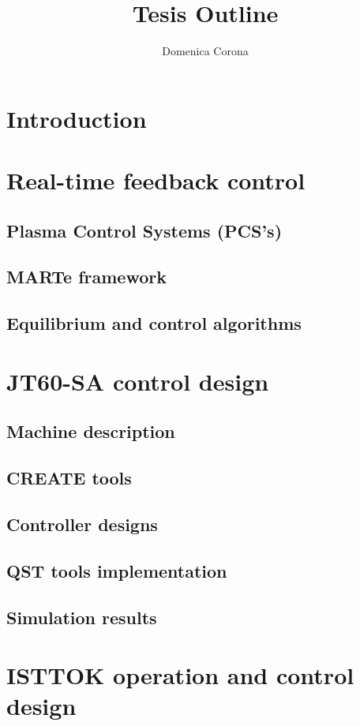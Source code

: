 \documentclass{article}
\title{Tesis Outline}
\author{Domenica Corona }
\begin{document}
\maketitle

\section{Introduction}
\hfil

\section{Real-time feedback control}
\subsection{Plasma Control Systems (PCS's)}
\subsection{MARTe framework}
\subsection{Equilibrium and control algorithms} 
 
\hfil
\section{JT60-SA control design}
\subsection{Machine description}
\subsection{CREATE tools}
\subsection{Controller designs}
\subsection{QST tools implementation}
\subsection{Simulation results}
\hfil
\section{ISTTOK operation and control design}
\end{document}
